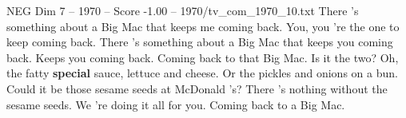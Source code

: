 \begin{textsample}{NEG Dim 7 – 1970 – Score -1.00 – 1970/tv\_com\_1970\_10.txt}  \label{ex:f7_neg_064}
There 's something about a Big Mac that keeps me coming back.
You, you 're the one to keep coming back.
There 's something about a Big Mac that keeps you coming back.
Keeps you coming back.
Coming back to that Big Mac.
Is it the two?
Oh, the fatty \textbf{special} sauce, lettuce and cheese.
Or the pickles and onions on a bun.
Could it be those sesame seeds at McDonald 's?
There 's nothing without the sesame seeds.
We 're doing it all for you.
Coming back to a Big Mac.

\end{textsample}
